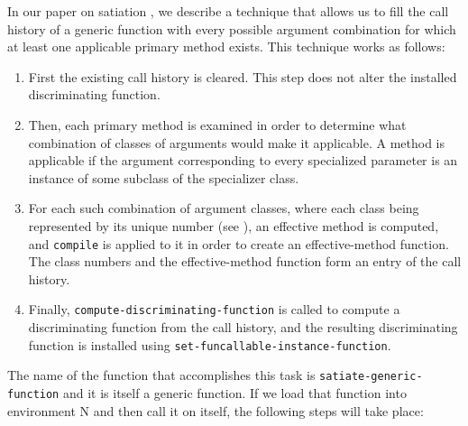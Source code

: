 In our paper on satiation \cite{Strandh:2014:RMI:2635648.2635656}, we
describe a technique that allows us to fill the call history of a
generic function with every possible argument combination for which at
least one applicable primary method exists.  This technique works as
follows:

\begin{enumerate}
\item First the existing call history is cleared.  This step does not
  alter the installed discriminating function.
\item Then, each primary method is examined in order to determine
  what combination of classes of arguments would make it applicable.
  A method is applicable if the argument corresponding to every
  specialized parameter is an instance of some subclass of the
  specializer class.
\item For each such combination of argument classes, where each class
  being represented by its unique number (see
  \cite{Durand-Strandh:2019:ELS:Bootstrapping}), an effective method
  is computed, and \texttt{compile} is applied to it in order to
  create an effective-method function.  The class numbers and the
  effective-method function form an entry of the call history.
\item Finally, \texttt{compute-discriminating-function} is called to
  compute a discriminating function from the call history, and the
  resulting discriminating function is installed using
  \texttt{set-funcallable-instance-function}.
\end{enumerate}

The name of the function that accomplishes this task is
\texttt{satiate-generic-function} and it is itself a generic
function.  If we load that function into environment N and then call
it on itself, the following steps will take place:

